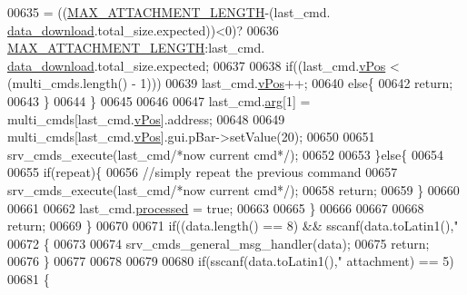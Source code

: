 \begin{DoxyCode}
{{{{{{{{{{{{{{{{{{00635                              = ((\hyperlink{a00031_aa8abe3a822c64813f7aaba3ca7e3db9c}{MAX\_ATTACHMENT\_LENGTH}-(last\_cmd.
      \hyperlink{a00001_a5cfeaed4d4f8e51070a324c0ba893ebe}{data\_download}.total\_size.expected))<0)?
00636                                  \hyperlink{a00031_aa8abe3a822c64813f7aaba3ca7e3db9c}{MAX\_ATTACHMENT\_LENGTH}:last\_cmd.
      \hyperlink{a00001_a5cfeaed4d4f8e51070a324c0ba893ebe}{data\_download}.total\_size.expected;
00637                      
00638                      \textcolor{keywordflow}{if}((last\_cmd.\hyperlink{a00001_a2b48b371fd84be2a8ad581b1ad708b88}{vPos} < (multi\_cmds.length() - 1)))
00639                          last\_cmd.\hyperlink{a00001_a2b48b371fd84be2a8ad581b1ad708b88}{vPos}++;
00640                      \textcolor{keywordflow}{else}\{
00642                          \textcolor{keywordflow}{return};
00643                       \}
00644                      \}
00645 
00646 
00647                      last\_cmd.\hyperlink{a00001_a56e6c2d7315d0ae60a51e8b140c9cfe4}{arg}[1] = multi\_cmds[last\_cmd.\hyperlink{a00001_a2b48b371fd84be2a8ad581b1ad708b88}{vPos}].address;
00648 
00649                      multi\_cmds[last\_cmd.\hyperlink{a00001_a2b48b371fd84be2a8ad581b1ad708b88}{vPos}].gui.pBar->setValue(20);
00650 
00651                      srv\_cmds\_execute(last\_cmd\textcolor{comment}{/*now current cmd*/});
00652 
00653                  \}\textcolor{keywordflow}{else}\{
00654 
00655                      \textcolor{keywordflow}{if}(repeat)\{
00656                         \textcolor{comment}{//simply repeat the previous command}
00657                         srv\_cmds\_execute(last\_cmd\textcolor{comment}{/*now current cmd*/});
00658                         \textcolor{keywordflow}{return};
00659                      \}
00660 
00661 
00662                      last\_cmd.\hyperlink{a00001_a3e88f779da9798a5da7dda227e2ca388}{processed} = \textcolor{keyword}{true};
00663 
00665                  \}
00666 
00667 
00668             \textcolor{keywordflow}{return};
00669          \}
00670 
00671         \textcolor{keywordflow}{if}((data.length() == 8) && sscanf(data.toLatin1(),\textcolor{stringliteral}{"%
00672         \{
00673 
00674             srv\_cmds\_general\_msg\_handler(data);
00675             \textcolor{keywordflow}{return};
00676         \}
00677        
00678         
00679 
00680         \textcolor{keywordflow}{if}(sscanf(data.toLatin1(),\textcolor{stringliteral}{"%
      attachment) == 5)
00681         \{
}}}}}}}}}}}}}}}}}}}}
\end{DoxyCode}
